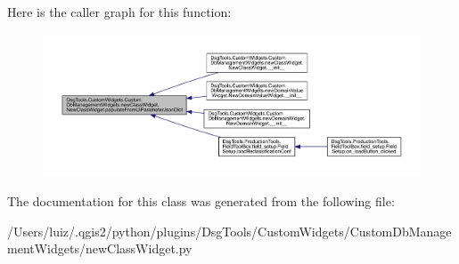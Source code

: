 Here is the caller graph for this function\+:
\nopagebreak
\begin{figure}[H]
\begin{center}
\leavevmode
\includegraphics[width=350pt]{class_dsg_tools_1_1_custom_widgets_1_1_custom_db_management_widgets_1_1new_class_widget_1_1_new_class_widget_aaec55aa688c84ae74a41be0a7276ef65_icgraph}
\end{center}
\end{figure}


The documentation for this class was generated from the following file\+:\begin{DoxyCompactItemize}
\item 
/\+Users/luiz/.\+qgis2/python/plugins/\+Dsg\+Tools/\+Custom\+Widgets/\+Custom\+Db\+Management\+Widgets/new\+Class\+Widget.\+py\end{DoxyCompactItemize}

